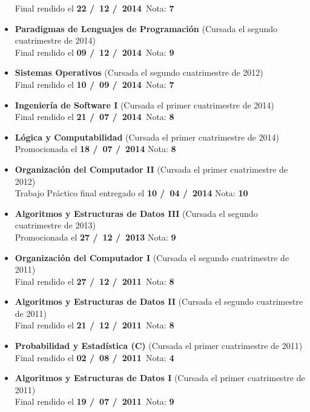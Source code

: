 \begin{itemize}[leftmargin=0.8cm]
{Final rendido el \textbf{22 \slash \ 12 \slash \ 2014}\  \hfill Nota: \textbf{7}}
\item{\textbf{Paradigmas de Lenguajes de Programación} (Cursada el segundo cuatrimestre de 2014)\\
Final rendido el \textbf{09 \slash \ 12 \slash \ 2014}\  \hfill Nota: \textbf{9}}
\item{\textbf{Sistemas Operativos} (Cursada el segundo cuatrimestre de 2012)\\
Final rendido el \textbf{10 \slash \ 09 \slash \ 2014}\  \hfill Nota: \textbf{7}}
\item{\textbf{Ingeniería de Software I} (Cursada el primer cuatrimestre de 2014)\\
Final rendido el \textbf{21 \slash \ 07 \slash \ 2014}\  \hfill Nota: \textbf{8}}
\item{\textbf{Lógica y Computabilidad} (Cursada el primer cuatrimestre de 2014)\\
Promocionada el \textbf{18 \slash \ 07 \slash \ 2014} \hfill Nota: \textbf{8}}
\item{\textbf{Organización del Computador II} (Cursada el primer cuatrimestre de 2012)\\
Trabajo Práctico final entregado el \textbf{10 \slash \ 04 \slash \ 2014} \hfill Nota: \textbf{10}}
\item{\textbf{Algoritmos y Estructuras de Datos III} (Cursada el segundo cuatrimestre de 2013)\\
Promocionada el \textbf{27 \slash \ 12 \slash \ 2013} \hfill Nota: \textbf{9}}
\item{\textbf{Organización del Computador I} (Cursada el segundo cuatrimestre de 2011)\\
Final rendido el \textbf{27 \slash \ 12 \slash \ 2011}\  \hfill Nota: \textbf{8}}
\item{\textbf{Algoritmos y Estructuras de Datos II} (Cursada el segundo cuatrimestre de 2011)\\
Final rendido el \textbf{21 \slash \ 12 \slash \ 2011}\  \hfill Nota: \textbf{8}}
\item{\textbf{Probabilidad y Estadística (C)} (Cursada el primer cuatrimestre de 2011)\\
Final rendido el \textbf{02 \slash \ 08 \slash \ 2011}\  \hfill Nota: \textbf{4}}
\item{\textbf{Algoritmos y Estructuras de Datos I} (Cursada el primer cuatrimestre de 2011)\\
Final rendido el \textbf{19 \slash \ 07 \slash \ 2011}\  \hfill Nota: \textbf{9}}

\end{itemize}
